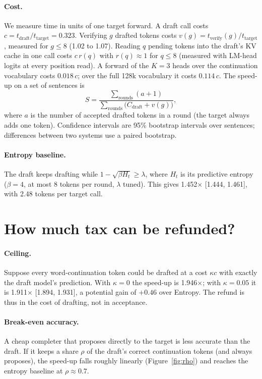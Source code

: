 \documentclass[11pt]{article}
\newcommand{\x}{$\times$}
\begin{document}
\paragraph{Cost.} We measure time in units of one target forward. A draft call costs
$c = t_\text{draft}/t_\text{target} = 0.323$. Verifying $g$ drafted tokens costs
$v(g) = t_\text{verify}(g)/t_\text{target}$, measured for $g\le 8$ (1.02 to 1.07). Reading $q$
pending tokens into the draft's KV cache in one call costs $c\,r(q)$ with $r(q)\approx 1$ for $q \le 8$
(measured with LM-head logits at every position read). A forward of the $K=3$ heads over the continuation vocabulary costs $0.018\,c$; over the
full 128k vocabulary it costs $0.114\,c$. The speed-up on a set of sentences is
\begin{equation}
S = \frac{\sum_\text{rounds} (a + 1)}{\sum_\text{rounds} \big(C_\text{draft} + v(g)\big)},
\end{equation}
where $a$ is the number of accepted drafted tokens in a round (the target always adds one token).
Confidence intervals are 95\% bootstrap intervals over sentences; differences between two
systems use a paired bootstrap.

\paragraph{Entropy baseline.} The draft keeps drafting while
$1-\sqrt{\beta H_t} \ge \lambda$, where $H_t$ is its predictive entropy ($\beta=4$, at most 8 tokens
per round, $\lambda$ tuned). This gives 1.452\x{} [1.444, 1.461], with 2.48 tokens per target call.

\section{How much tax can be refunded?}
\label{sec:feasibility}

\paragraph{Ceiling.} Suppose every word-continuation token could be drafted at a cost $\kappa c$ with
exactly the draft model's prediction. With $\kappa=0$ the speed-up is 1.946\x; with $\kappa = 0.05$
it is 1.911\x{} [1.894, 1.931], a potential gain of $+0.46$ over Entropy. The refund is thus in the
cost of drafting, not in acceptance.

\paragraph{Break-even accuracy.} A cheap completer that proposes directly to the target is less
accurate than the draft. If it keeps a share $\rho$ of the draft's correct continuation tokens (and
always proposes), the speed-up falls roughly linearly (Figure~\ref{fig:rho}) and reaches the entropy
baseline at $\rho\approx0.7$.
\end{document}
